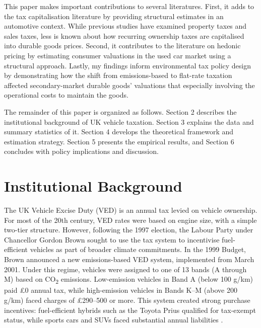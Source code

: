 \documentclass[12pt, a4paper]{article}
\begin{document}
This paper makes important contributions to several literatures. First, it adds to the tax capitalisation literature \cite{oates1969, busse2006} by providing structural estimates in an automotive context. While previous studies have examined property taxes and sales taxes, less is known about how recurring ownership taxes are capitalised into durable goods prices. Second, it contributes to the literature on hedonic pricing \cite{rosen1974, berry1995} by estimating consumer valuations in the used car market using a structural approach. Lastly, my findings inform environmental tax policy design by demonstrating how the shift from emissions-based to flat-rate taxation affected secondary-market durable goods' valuations that especially involving the operational costs to maintain the goods.

The remainder of this paper is organized as follows. Section 2 describes the institutional background of UK vehicle taxation. Section 3 explains the data and summary statistics of it. Section 4 develops the theoretical framework and estimation strategy. Section 5 presents the empirical results, and Section 6 concludes with policy implications and discussion.

\section{Institutional Background}
The UK Vehicle Excise Duty (VED) is an annual tax levied on vehicle ownership. For most of the 20th century, VED rates were based on engine size, with a simple two-tier structure. However, following the 1997 election, the Labour Party under Chancellor Gordon Brown sought to use the tax system to incentivise fuel-efficient vehicles as part of broader climate commitments. In the 1999 Budget, Brown announced a new emissions-based VED system, implemented from March 2001. Under this regime, vehicles were assigned to one of 13 bands (A through M) based on CO\textsubscript{2} emissions. Low-emission vehicles in Band A (below 100 g/km) paid \pounds 0 annual tax, while high-emission vehicles in Bands K--M (above 200 g/km) faced charges of \pounds 290--500 or more. This system created strong purchase incentives: fuel-efficient hybrids such as the Toyota Prius qualified for tax-exempt status, while sports cars and SUVs faced substantial annual liabilities \citep{ukbudget1999, dvla2001, CerrutiAlberiniLinn2017}.
\end{document}
